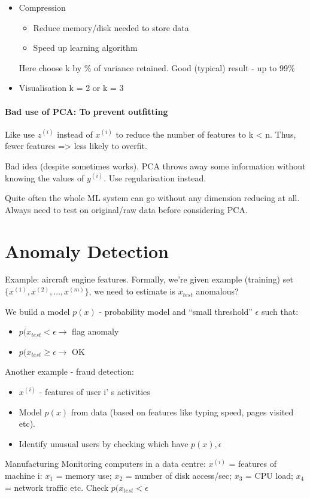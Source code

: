 \documentclass{scrartcl}
\begin{document}
\begin{itemize}
\item Compression
  \begin{itemize}
  \item Reduce memory/disk needed to store data
  \item Speed up learning algorithm
  \end{itemize}
Here choose k by \% of variance retained. Good (typical) result - up
to 99\%
\item Visualisation
k = 2 or k = 3
\end{itemize}

\paragraph{Bad use of PCA: To prevent outfitting} 

Like use $z^{(i)}$ instead of $x^{(i)}$ to reduce the number of
features to k < n. Thus, fewer features => less likely to overfit.

Bad idea (despite sometimes works). PCA throws away some information
without knowing the values of $y^{(i)}$. Use regularisation instead.

Quite often the whole ML system can go without any dimension reducing
at all. Always need to test on original/raw data before considering
PCA. 

\section{Anomaly Detection}
\label{sec:15}

Example: aircraft engine features.
Formally, we're given example (training) set $\{ x^{(1)}, x^{(2)},
\dots, x^{(m)} \}$, we need to estimate is $x_{test}$ anomalous? 

We build a model $p(x)$ - probability model and ``small threshold''
$\epsilon$ such that:
\begin{itemize}
\item $p(x_{test} < \epsilon \rightarrow$ flag anomaly
\item $p(x_{test} \geq \epsilon \to$ OK
\end{itemize}

Another example - fraud detection:
\begin{itemize}
\item $x^{(i)}$ - features of user i' s activities
\item Model $p(x)$ from data (based on features like typing speed,
  pages visited etc).
\item Identify unusual users by checking which have $p(x) , \epsilon$
\end{itemize}
Manufacturing
Monitoring computers in a data centre: $x^(i)$ = features of machine
i: $x_1$ = memory use; $x_2$ = number of disk access/sec; $x_3$ = CPU
load; $x_4$ = network traffic etc. Check $p(x_{test} < \epsilon$
\end{document}

